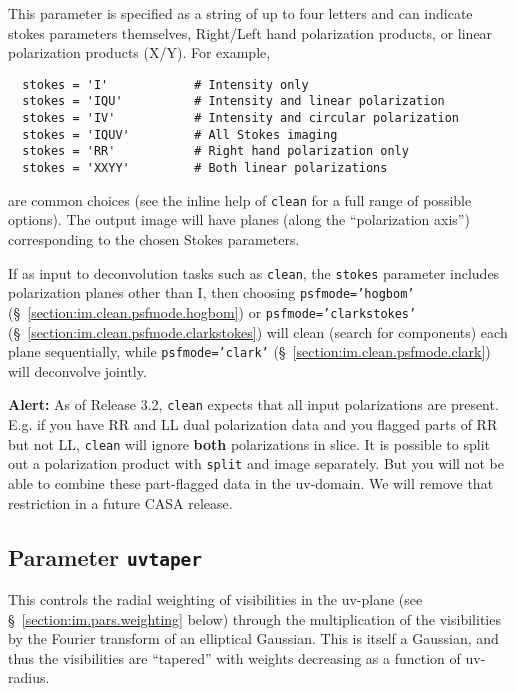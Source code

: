 This parameter is specified as a string of up to four letters and can
indicate stokes parameters themselves, Right/Left hand polarization
products, or linear polarization products (X/Y). 
For example,
\small
\begin{verbatim}
  stokes = 'I'            # Intensity only
  stokes = 'IQU'          # Intensity and linear polarization
  stokes = 'IV'           # Intensity and circular polarization
  stokes = 'IQUV'         # All Stokes imaging
  stokes = 'RR'           # Right hand polarization only
  stokes = 'XXYY'         # Both linear polarizations 
\end{verbatim}
\normalsize
are common choices (see the inline help of {\tt clean} for a full
range of possible options).
The output image will have planes (along the ``polarization axis'')
corresponding to the chosen Stokes parameters.  

If as input to deconvolution tasks such as {\tt clean}, the {\tt stokes} parameter
includes polarization planes other than I, then choosing {\tt psfmode='hogbom'} 
(\S~\ref{section:im.clean.psfmode.hogbom}) or {\tt psfmode='clarkstokes'} 
(\S~\ref{section:im.clean.psfmode.clarkstokes}) will clean (search for
components) each plane sequentially, while {\tt psfmode='clark'} 
(\S~\ref{section:im.clean.psfmode.clark}) will deconvolve jointly.

{\bf Alert:} As of Release 3.2, {\tt clean} expects that all input
polarizations are present. E.g. if you have RR and LL dual
polarization data and you flagged parts of RR but not LL, {\tt clean} will
ignore {\bf both} polarizations in slice. It is possible to split out a
polarization product with {\tt split} and image separately. But you
will not be able to combine these part-flagged data in the uv-domain. 
We will remove that restriction in a future
CASA release.


\subsection{Parameter {\tt uvtaper} }
\label{section:im.pars.uvtaper}

This controls the radial weighting of visibilities in the uv-plane
(see \S~\ref{section:im.pars.weighting} below) through the multiplication
of the visibilities by the Fourier transform of an elliptical Gaussian.
This is itself a Gaussian, and thus the visibilities are ``tapered'' with
weights decreasing as a function of uv-radius.


